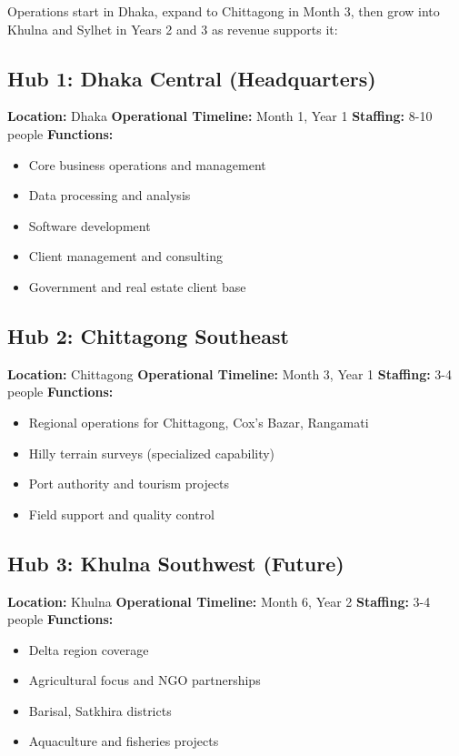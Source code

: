 Operations start in Dhaka, expand to Chittagong in Month 3, then grow into Khulna and Sylhet in Years 2 and 3 as revenue supports it:

\subsection{Hub 1: Dhaka Central (Headquarters)}

\textbf{Location:} Dhaka
\textbf{Operational Timeline:} Month 1, Year 1
\textbf{Staffing:} 8-10 people
\textbf{Functions:}
\begin{itemize}
    \item Core business operations and management
    \item Data processing and analysis
    \item Software development
    \item Client management and consulting
    \item Government and real estate client base
\end{itemize}

\subsection{Hub 2: Chittagong Southeast}

\textbf{Location:} Chittagong
\textbf{Operational Timeline:} Month 3, Year 1
\textbf{Staffing:} 3-4 people
\textbf{Functions:}
\begin{itemize}
    \item Regional operations for Chittagong, Cox's Bazar, Rangamati
    \item Hilly terrain surveys (specialized capability)
    \item Port authority and tourism projects
    \item Field support and quality control
\end{itemize}

\subsection{Hub 3: Khulna Southwest (Future)}

\textbf{Location:} Khulna
\textbf{Operational Timeline:} Month 6, Year 2
\textbf{Staffing:} 3-4 people
\textbf{Functions:}
\begin{itemize}
    \item Delta region coverage
    \item Agricultural focus and NGO partnerships
    \item Barisal, Satkhira districts
    \item Aquaculture and fisheries projects
\end{itemize}

